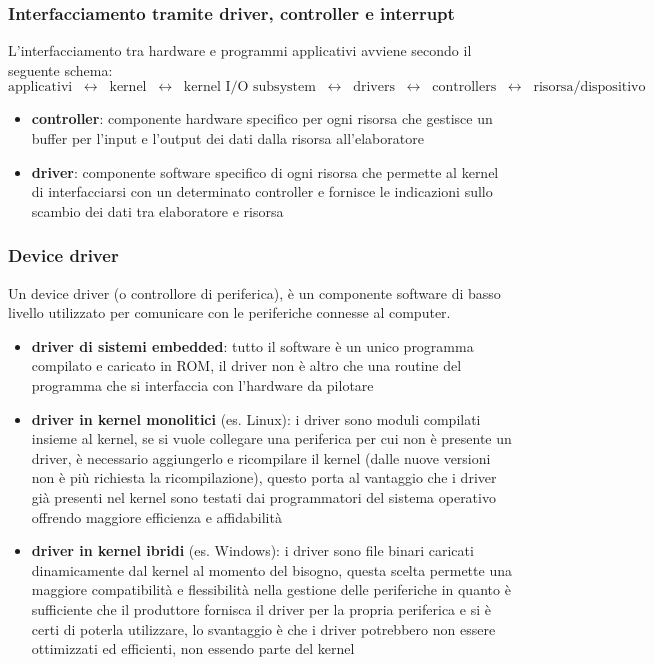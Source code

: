 \documentclass[a4paper]{article}
\begin{document}
\subsubsection*{Interfacciamento tramite driver, controller e interrupt}
L'interfacciamento tra hardware e programmi applicativi avviene secondo il seguente schema:
\[\text{applicativi} \;\;\leftrightarrow\;\; \text{kernel} \;\;\leftrightarrow\;\; \text{kernel I/O subsystem} \;\;\leftrightarrow\;\; \text{drivers} \;\;\leftrightarrow\;\; \text{controllers} \;\;\leftrightarrow\;\; \text{risorsa/dispositivo}\]
\begin{itemize}
	\item \textbf{controller}: componente hardware specifico per ogni risorsa che gestisce un buffer per l'input e l'output dei
	dati dalla risorsa all'elaboratore
	\item \textbf{driver}: componente software specifico di ogni risorsa che permette al kernel di interfacciarsi con un
	determinato controller e fornisce le indicazioni sullo scambio dei dati tra elaboratore e risorsa
\end{itemize}

\subsubsection*{Device driver}
Un device driver (o controllore di periferica), è un componente software di basso livello utilizzato per comunicare con le periferiche
connesse al computer.
\begin{itemize}
	\item \textbf{driver di sistemi embedded}: tutto il software è un unico programma compilato e caricato in ROM, il driver non è
	altro che una routine del programma che si interfaccia con l'hardware da pilotare
	\item \textbf{driver in kernel monolitici} (es. Linux): i driver sono moduli compilati insieme al kernel, se si vuole collegare
	una periferica per cui non è presente un driver, è necessario aggiungerlo e ricompilare il kernel (dalle nuove versioni non
	è più richiesta la ricompilazione), questo porta al vantaggio che i driver già presenti nel kernel sono testati dai programmatori
	del sistema operativo offrendo maggiore efficienza e affidabilità
	\item \textbf{driver in kernel ibridi} (es. Windows): i driver sono file binari caricati dinamicamente dal kernel al momento
	del bisogno, questa scelta permette una maggiore compatibilità e flessibilità nella gestione delle periferiche in quanto è
	sufficiente che il produttore fornisca il driver per la propria periferica e si è certi di poterla utilizzare, lo svantaggio
	è che i driver potrebbero non essere ottimizzati ed efficienti, non essendo parte del kernel
\end{itemize}
\end{document}

